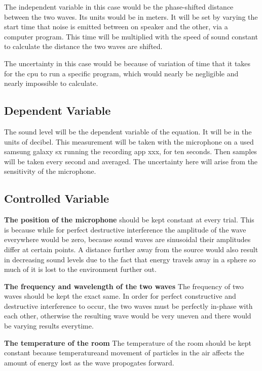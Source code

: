 \documentclass[12pt]{article}
\begin{document}
The independent variable in this case would be the phase-shifted distance between the two waves. Its units would be in meters. It will be set by varying the start time that noise is emitted between on speaker and the other, via a computer program. This time will be multiplied with the speed of sound constant to calculate the distance the two waves are shifted.

The uncertainty in this case would be because of variation of time that it takes for the cpu to run a specific program, which would nearly be negligible and nearly impossible to calculate.

\subsection{Dependent Variable}

The sound level will be the dependent variable of the equation. It will be in the units of decibel. This measurement will be taken with the microphone on a used samsung galaxy sx running the recording app xxx, for ten seconds. Then samples will be taken every second and averaged. The uncertainty here will arise from the sensitivity of the microphone.

\subsection{Controlled Variable}

\textbf{The position of the microphone} should be kept constant at every trial. This is because while for perfect destructive interference the amplitude of the wave everywhere would be zero, because sound waves are sinusoidal their amplitudes differ at certain points. A distance further away from the source would also result in decreasing sound levels due to the fact that energy travels away in a sphere so much of it is lost to the environment further out.

\textbf{The frequency and wavelength of the two waves} The frequency of two waves should be kept the exact same. In order for perfect constructive and destructive interference to occur, the two waves must be perfectly in-phase with each other, otherwise the resulting wave would be very uneven and there would be varying results everytime.

\textbf{The temperature of the room} The temperature of the room should be kept constant because temperatureand movement of particles in the air affects the amount of energy lost as the wave propogates forward.
\end{document}

